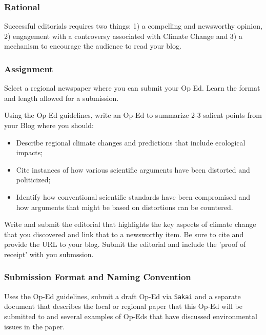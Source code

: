 
\subsubsection{Rational}

Successful editorials requires two things: 1) a compelling and newsworthy opinion, 2) engagement with a controversy associated with Climate Change and 3) a mechanism to encourage the audience to read your blog. 

\subsubsection{Assignment}

Select a regional newspaper where you can submit your Op Ed. Learn the format and length allowed for a submission. 

Using the Op-Ed guidelines, write an Op-Ed to summarize 2-3 salient points from your Blog where you should:

\begin{itemize}
  \item Describe regional climate changes and predictions that include ecological impacts; 
  \item Cite instances of how various scientific arguments have been distorted and politicized;
  \item Identify how conventional scientific standards have been compromised and how arguments that might be based on distortions can be countered.
\end{itemize}

Write and submit the editorial that highlights the key aspects of climate change that you discovered and link that to a newsworthy item. Be sure to cite and provide the URL to your blog. Submit the editorial and include the 'proof of receipt' with you submssion. 


\subsubsection{Submission Format and Naming Convention}

Uses the Op-Ed guidelines, submit a draft Op-Ed via \texttt{Sakai} and a separate document that describes the local or regional paper that this Op-Ed will be submitted to and several examples of Op-Eds that have discussed environmental issues in the paper.

